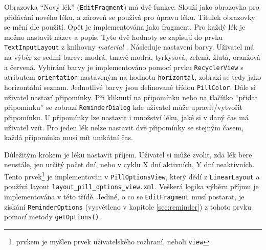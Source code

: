 \documentclass[../TakeYourPill.tex]{subfiles}
\begin{document}
Obrazovka \enquote{Nový lék} (\texttt{EditFragment}) má dvě funkce. Slouží jako obrazovka pro přidávání nového léku, a zároveň se používá pro úpravu léku. Titulek obrazovky se mění dle použití. Opět je implementována jako fragment. Pro každý lék je možno nastavit název a popis. Tyto dvě hodnoty se zapisují do prvku \texttt{TextInputLayout} z knihovny \textit{material} \cite{materialdesign-android}. Následuje nastavení barvy. Uživatel má na výběr ze sedmi barev: modrá, tmavě modrá, tyrkysová, zelená, žlutá, oranžová a červená. Vybírání barvy je implementováno pomocí prvku \texttt{RecyclerView} s atributem \texttt{orientation} nastaveným na hodnotu \texttt{horizontal}, zobrazí se tedy jako horizontální seznam. Jednotlivé barvy jsou definované třídou \texttt{PillColor}. Dále si uživatel nastaví připomínky. Při kliknutí na připomínku nebo na tlačítko \enquote{přidat připomínku} se zobrazí \texttt{ReminderDialog} kde uživatel může upravit/vytvořit připomínku. U připomínky lze nastavit i množství léku, jaké si v daný čas má uživatel vzít. Pro jeden lék nelze nastavit dvě připomínky se stejným časem, každá připomínka musí mít unikátní čas. 

Důležitým krokem je léku nastavit příjem. Uživatel si může zvolit, zda lék bere neustále, jen určitý počet dní, nebo v cyklu X dní aktivních, Y dní neaktivních. Tento prvek\footnote{prvkem je myšlen prvek uživatelského rozhraní, neboli \texttt{view}} je implementován v \texttt{PillOptionsView}, který dědí z \texttt{LinearLayout} a používá layout \texttt{layout\_pill\_options\_view.xml}. Veškerá logika výběru příjmu je implementována v této třídě. Jediné, o co se \texttt{EditFragment} musí postarat, je získání \texttt{ReminderOptions} (vysvětleno v kapitole \ref{sec:reminder}) z tohoto prvku pomocí metody \texttt{getOptions()}.
\end{document}
